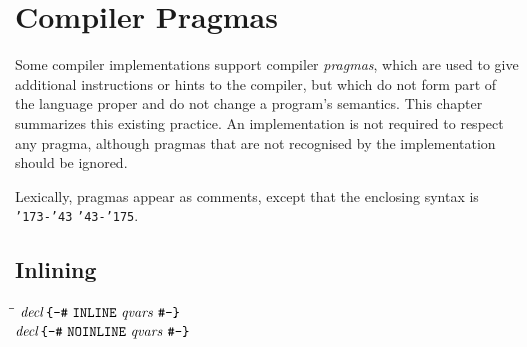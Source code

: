 %
%
\chapter{Compiler Pragmas}
\label{pragmas}

Some compiler implementations support compiler {\em pragmas}, which
are used to give additional instructions or hints to the compiler, but
which do not form part of the \Haskell{} language proper and do not
change a program's semantics.  This chapter summarizes this existing
practice.  An implementation is not required to respect any pragma,
although pragmas that are not recognised by the implementation should
be ignored.  

Lexically, pragmas appear as comments, except that the enclosing
syntax is \mbox{\tt {\char'173}-{\char'43}} \mbox{\tt {\char'43}-{\char'175}}.

\section{Inlining}
\begin{flushleft}\it\begin{tabbing}
\hspace{0.6in}\=\hspace{3.1in}\=\kill
$\it decl$\>\makebox[3.5em]{$\rightarrow$}$\it \makebox{\tt {\char'173}-{\char'43}}\ \makebox{\tt INLINE}\ qvars\ \makebox{\tt {\char'43}-{\char'175}}$\\ 
$\it decl$\>\makebox[3.5em]{$\rightarrow$}$\it \makebox{\tt {\char'173}-{\char'43}}\ \makebox{\tt NOINLINE}\ qvars\ \makebox{\tt {\char'43}-{\char'175}}$
\end{tabbing}\end{flushleft}

